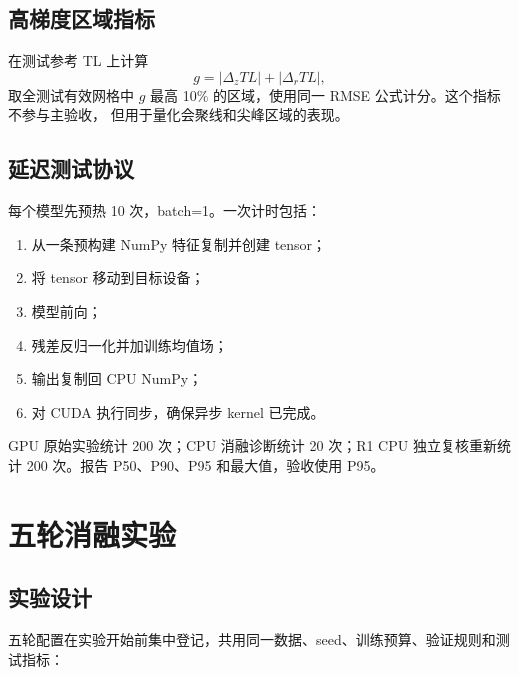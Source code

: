 \documentclass[UTF8,12pt,openany]{ctexrep}
\begin{document}
\section{高梯度区域指标}

在测试参考 TL 上计算
\begin{equation}
  g=|\Delta_zTL|+|\Delta_rTL|,
\end{equation}
取全测试有效网格中 $g$ 最高 10\% 的区域，使用同一 RMSE 公式计分。这个指标不参与主验收，
但用于量化会聚线和尖峰区域的表现。

\section{延迟测试协议}

每个模型先预热 10 次，batch=1。一次计时包括：
\begin{enumerate}
  \item 从一条预构建 NumPy 特征复制并创建 tensor；
  \item 将 tensor 移动到目标设备；
  \item 模型前向；
  \item 残差反归一化并加训练均值场；
  \item 输出复制回 CPU NumPy；
  \item 对 CUDA 执行同步，确保异步 kernel 已完成。
\end{enumerate}
GPU 原始实验统计 200 次；CPU 消融诊断统计 20 次；R1 CPU 独立复核重新统计 200 次。报告
P50、P90、P95 和最大值，验收使用 P95。

\chapter{五轮消融实验}
\label{chap:ablation}

\section{实验设计}

五轮配置在实验开始前集中登记，共用同一数据、seed、训练预算、验证规则和测试指标：
\end{document}
